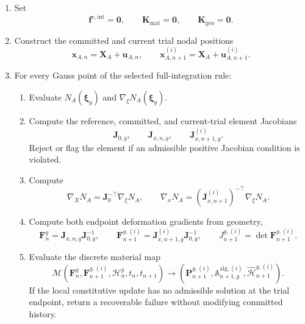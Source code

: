 \documentclass[11pt,a4paper]{article}
\newcommand{\bs}[1]{\boldsymbol{#1}}
\newcommand{\F}{\bs{F}}
\newcommand{\Pstress}{\bs{P}}
\newcommand{\vct}[1]{\mathbf{#1}}
\begin{document}
\begin{enumerate}
    \item Set
    \begin{equation*}
    \vct f^{e,\mathrm{int}}=\vct{0},\qquad
    \vct{K}_{\mathrm{mat}}=\vct{0},\qquad
    \vct{K}_{\mathrm{geo}}=\vct{0}.
    \end{equation*}

    \item Construct the committed and current trial nodal positions
    \begin{equation*}
    \bs{x}_{A,n}=\bs{X}_A+\bs{u}_{A,n},
    \qquad
    \bs{x}_{A,n+1}^{(i)}=\bs{X}_A+\bs{u}_{A,n+1}^{(i)}.
    \end{equation*}

    \item For every Gauss point of the selected full-integration rule:
    \begin{enumerate}
        \item Evaluate $N_A(\bs{\xi}_g)$ and $\nabla_{\xi}N_A(\bs{\xi}_g)$.

        \item Compute the reference, committed, and current-trial element Jacobians
        \begin{equation*}
        \vct{J}_{0,g},\qquad
        \vct{J}_{x,n,g},\qquad
        \vct{J}_{x,n+1,g}^{(i)}.
        \end{equation*}
        Reject or flag the element if an admissible positive Jacobian condition is violated.

        \item Compute
        \begin{equation*}
        \nabla_XN_A=\vct{J}_0^{-\top}\nabla_{\xi}N_A,
        \qquad
        \nabla_xN_A=(\vct{J}_{x,n+1}^{(i)})^{-\top}\nabla_{\xi}N_A.
        \end{equation*}

        \item Compute both endpoint deformation gradients from geometry,
        \begin{equation*}
        \F_n^g=\vct{J}_{x,n,g}\vct{J}_{0,g}^{-1},
        \qquad
        \F_{n+1}^{g,(i)}=\vct{J}_{x,n+1,g}^{(i)}\vct{J}_{0,g}^{-1},
        \qquad
        J_{n+1}^{g,(i)}=\det\F_{n+1}^{g,(i)}.
        \end{equation*}

        \item Evaluate the discrete material map
        \begin{equation*}
        \mathcal M
        \left(\F_n^g,\F_{n+1}^{g,(i)},\mathcal H_n^g,t_n,t_{n+1}\right)
        \longrightarrow
        \left(\Pstress_{n+1}^{g,(i)},\mathbb A_{n+1,g}^{\mathrm{alg},(i)},\widehat{\mathcal H}_{n+1}^{g,(i)}\right).
        \end{equation*}
        If the local constitutive update has no admissible solution at the trial endpoint, return a recoverable failure without modifying committed history.


\end{enumerate}
\end{enumerate}
\end{document}
